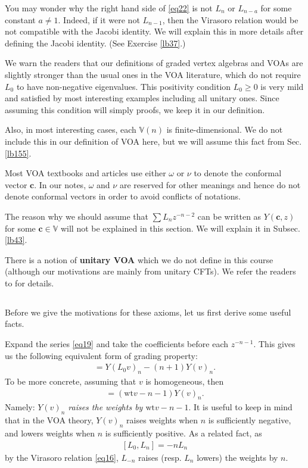 \documentclass[11pt,b5paper,notitlepage]{article}
\theoremstyle{definition}
\theoremstyle{plain}
\newcommand{\Vbb}{\mathbb V}
\newcommand{\cbf}{\mathbf c}
\newcommand{\wt}{\mathrm{wt}}
\numberwithin{equation}{section}
\begin{document}
You may wonder why the right hand side of \eqref{eq22} is not $L_n$ or $L_{n-a}$ for some constant $a\neq 1$. Indeed, if it were not $L_{n-1}$, then the Virasoro relation would be not compatible with the Jacobi identity. We will explain this in more details after defining the Jacobi identity. (See Exercise \ref{lb37}.)



We warn the readers that our definitions of graded vertex algebras and VOAs are slightly stronger than the usual ones in the VOA literature, which do not require  $L_0$ to have non-negative eigenvalues. This positivity condition $L_0\geq 0$ is very mild and satisfied by most interesting examples including all unitary ones. Since assuming this condition will simply proofs, we keep it in our definition.

Also, in most interesting cases, each $\Vbb(n)$ is finite-dimensional. We do not include this in our definition of VOA here, but we will assume this fact from Sec. \ref{lb155}.

Most VOA textbooks and articles use either $\omega$ or $\nu$ to denote the conformal vector $\cbf$. In our notes, $\omega$ and $\nu$ are reserved for other meanings and hence do not denote conformal vectors in order to avoid conflicts of notations. 

The reason why we should assume that $\sum L_nz^{-n-2}$ can be written as $Y(\cbf,z)$ for some $\cbf\in\Vbb$ will not be explained in this section. We will explain it in Subsec. \ref{lb43}.

There is a notion of \textbf{unitary VOA} which we do not define in this course (although our motivations are mainly from unitary CFTs). We refer the readers to \cite{CKLW18,DL14} for details.


\subsection{}

Before we give the motivations for these axioms, let us first derive some useful facts.

Expand the series \eqref{eq19} and take the coefficients before each $z^{-n-1}$. This gives us  the following equivalent form of grading property:
\begin{align}
[L_0,Y(v)_n]=Y(L_0v)_n-(n+1)Y(v)_n.	\label{eq20}
\end{align}
To be more concrete, assuming that $v$ is homogeneous, then
\begin{align}
[L_0,Y(v)_n]=(\wt v-n-1)Y(v)_n.	\label{eq21}
\end{align}
Namely: \emph{$Y(v)_n$ raises the weights by $\wt v-n-1$}. It is useful to keep in mind that in the VOA theory, $Y(v)_n$ raises weights when $n$ is sufficiently negative, and lowers weights when $n$ is sufficiently positive. As a related fact, as
\begin{align}\label{eq57}
[L_0,L_n]=-nL_n	
\end{align}
by the Virasoro relation \eqref{eq16}, $L_{-n}$ raises (resp. $L_n$ lowers) the weights by $n$. 
\end{document}
